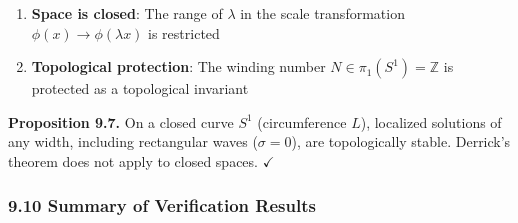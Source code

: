 \documentclass[a4paper,11pt]{article}
\providecommand{\tightlist}{\setlength{\itemsep}{0pt}\setlength{\parskip}{0pt}}
\begin{document}
\begin{enumerate}
\def\labelenumi{\arabic{enumi}.}
\tightlist
\item
  \textbf{Space is closed}: The range of \(\lambda\) in the scale
  transformation \(\phi(x) \to \phi(\lambda x)\) is restricted
\item
  \textbf{Topological protection}: The winding number
  \(N \in \pi_1(S^1) = \mathbb{Z}\) is protected as a topological
  invariant
\end{enumerate}

\textbf{Proposition 9.7.} On a closed curve \(S^1\) (circumference
\(L\)), localized solutions of any width, including rectangular waves
(\(\sigma = 0\)), are topologically stable. Derrick's theorem does not
apply to closed spaces. \(\checkmark\)

\subsubsection{9.10 Summary of Verification
Results}\label{summary-of-verification-results}
\end{document}
